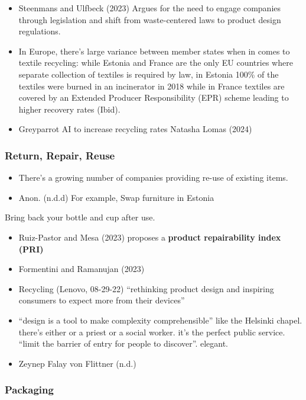 \documentclass[
  letterpaper,
  DIV=11,
  numbers=noendperiod]{scrartcl}
\providecommand{\tightlist}{%
  \setlength{\itemsep}{0pt}\setlength{\parskip}{0pt}}\usepackage{longtable,booktabs,array}
\begin{document}
\begin{itemize}
\item
  Steenmans and Ulfbeck (2023) Argues for the need to engage companies
  through legislation and shift from waste-centered laws to product
  design regulations.
\item
  In Europe, there's large variance between member states when in comes
  to textile recycling: while Estonia and France are the only EU
  countries where separate collection of textiles is required by law, in
  Estonia 100\% of the textiles were burned in an incinerator in 2018
  while in France textiles are covered by an Extended Producer
  Responsibility (EPR) scheme leading to higher recovery rates (Ibid).
\item
  Greyparrot AI to increase recycling rates Natasha Lomas (2024)
\end{itemize}

\subsubsection{Return, Repair, Reuse}\label{return-repair-reuse}

\begin{itemize}
\tightlist
\item
  There's a growing number of companies providing re-use of existing
  items.
\item
  Anon. (n.d.d) For example, Swap furniture in Estonia
\end{itemize}

Bring back your bottle and cup after use.

\begin{itemize}
\tightlist
\item
  Ruiz-Pastor and Mesa (2023) proposes a \textbf{product repairability
  index (PRI)}
\item
  Formentini and Ramanujan (2023)
\item
  Recycling (Lenovo, 08-29-22) ``rethinking product design and inspiring
  consumers to expect more from their devices''
\item
  ``design is a tool to make complexity comprehensible'' like the
  Helsinki chapel. there's either or a priest or a social worker. it's
  the perfect public service. ``limit the barrier of entry for people to
  discover''. elegant.
\item
  Zeynep Falay von Flittner (n.d.)
\end{itemize}

\subsubsection{Packaging}\label{packaging}
\end{document}
